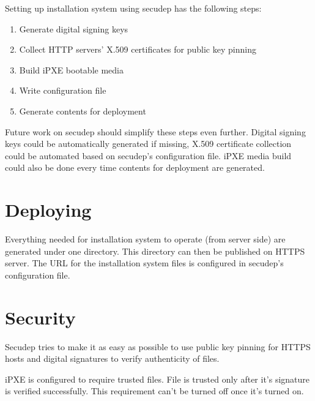 Setting up installation system using secudep has the following steps:

\begin{enumerate}
  \item Generate digital signing keys
  \item Collect HTTP servers' X.509 certificates for public key pinning
  \item Build iPXE bootable media
  \item Write configuration file
  \item Generate contents for deployment
\end{enumerate}

Future work on secudep should simplify these steps even further.
Digital signing keys could be automatically generated if missing,
X.509 certificate collection could be automated based on secudep's
configuration file. iPXE media build could also be done every time
contents for deployment are generated.

\section{Deploying}

Everything needed for installation system to operate (from server
side) are generated under one directory. This directory can then be
published on HTTPS server. The URL for the installation system files
is configured in secudep's configuration file.

\section{Security}

Secudep tries to make it as easy as possible to use public key pinning
for HTTPS hosts and digital signatures to verify authenticity of
files.

iPXE is configured to require trusted files. File is trusted only
after it's signature is verified successfully. This requirement can't
be turned off once it's turned on.
